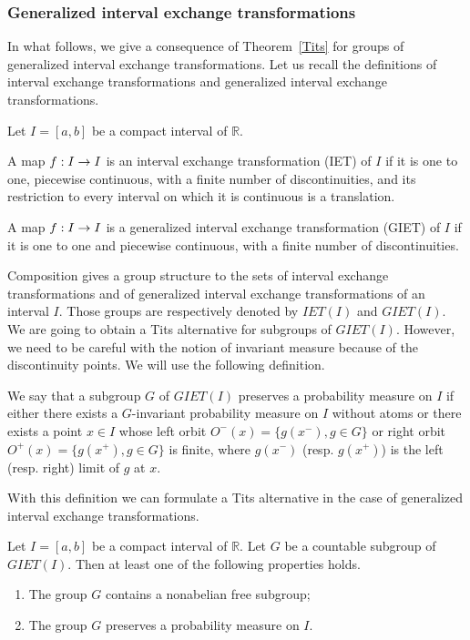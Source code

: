 \documentclass[AHL,Unicode,longabstracts,published]{cedram}
\newcommand{\R}{\mathbb{R}}
\newcounter{setofcase}
\newcounter{case}[setofcase]
\renewcommand*{\to}{\mathchoice{\longrightarrow}{\rightarrow}{\rightarrow}{\rightarrow}}
\newcommand{\R}{\mathbb{R}}
\begin{document}
\subsubsection*{Generalized interval exchange transformations}

In what follows, we give a consequence of Theorem~\ref{Tits} for groups of generalized interval exchange transformations. Let us recall the definitions of interval exchange transformations and generalized interval exchange transformations.



\begin{defi}
Let $I=[a,b]$ be a compact interval of $\R$.

A map $f:I\to I$ is an interval exchange transformation (IET) of $I$ if it is one to one, piecewise continuous, with a finite number of discontinuities, and its restriction to every interval on which it is continuous is a translation.

A map $f:I\to I$ is a generalized interval exchange transformation (GIET) of $I$ if it is one to one and piecewise continuous, with a finite number of discontinuities.
\end{defi}


Composition gives a group structure to the sets of interval exchange transformations and of generalized interval exchange transformations of an interval $I$. Those groups are respectively denoted by $\mathit{IET}(I)$ and $\mathit{GIET}(I)$. We are going to obtain a Tits alternative for subgroups of $\mathit{GIET}(I)$. However, we need to be careful with the notion of invariant measure because of the discontinuity points. We will use the following definition.

\begin{defi}\label{GIETmeasure}
We say that a subgroup $G$ of $\mathit{GIET}(I)$ preserves a probability measure on $I$ if either there exists a $G$-invariant probability measure on $I$ without atoms or there exists a point $x\in I$ whose left orbit $O^-(x)=\{g(x^-),g\in G\}$ or right orbit $O^+(x)=\{g(x^+),g\in G\}$ is finite, where $g(x^-)$ (resp. $g(x^+)$) is the left (resp. right) limit of $g$ at $x$.
\end{defi}

With this definition we can formulate a Tits alternative in the case of generalized interval exchange transformations.

\begin{theo}\label{TitsIET}
Let $I=[a,b]$ be a compact interval of $\R$. Let $G$ be a countable subgroup of $\mathit{GIET}(I)$. Then at least one of the following properties holds.
\begin{enumerate}
\item\label{theo1.10.1} The group $G$ contains a nonabelian free subgroup;
\item\label{theo1.10.2} The group $G$ preserves a probability measure on $I$.
\end{enumerate}
\end{theo}
\end{document}
